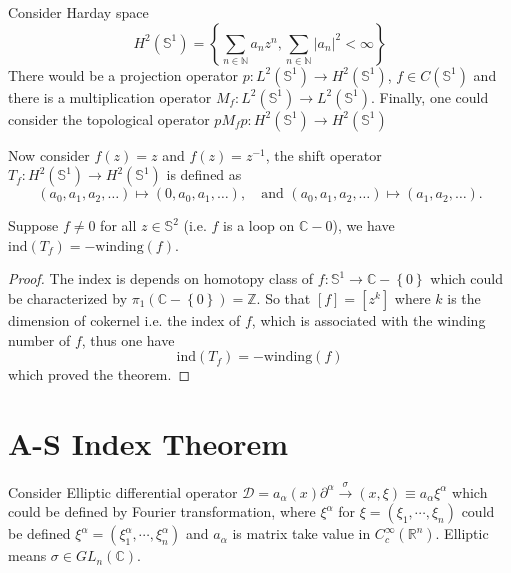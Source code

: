 \documentclass[10pt]{article}
\begin{document}
\begin{example}
  Consider Harday space
  \begin{equation*}
    H^{2}(\mathbb{S}^{1}) = \left\{ \sum_{n \in \mathbb{N}} a_{n} z^{n}, \sum_{n \in \mathbb{N}} \left| a_n \right|^{2} < \infty \right\}
  \end{equation*}
  There would be a projection operator $ p : L^{2}(\mathbb{S}^{1}) \rightarrow H^{2}(\mathbb{S}^{1})$, $ f \in C(\mathbb{S}^{1})$ and there is a multiplication operator $ M_{f} : L^{2}(\mathbb{S}^{1}) \rightarrow L^{2}(\mathbb{S}^{1})$.
  Finally, one could consider the topological operator $ p M_{f} p : H^{2}(\mathbb{S}^{1}) \rightarrow H^{2}(\mathbb{S}^{1})$

  Now consider $ f(z) = z$ and $ f(z) = z^{-1}$, the shift operator $ T_{f} : H^{2}(\mathbb{S}^{1}) \rightarrow H^{2}(\mathbb{S}^{1})$ is defined as
  \begin{equation*}
    (a_0, a_1, a_2, \ldots) \mapsto (0, a_0, a_1, \ldots), \quad \text{and } (a_0, a_1, a_2, \ldots) \mapsto (a_1, a_2, \ldots).
  \end{equation*}
  \begin{theorem}
    Suppose $ f \neq 0$ for all $ z \in \mathbb{S}^{2}$ (i.e. $ f$ is a loop on $ \mathbb{C}- {0}$), we have $ \mathrm{ind}(T_{f}) = - \mathrm{winding}(f)$.
  \end{theorem}
  \begin{proof}
    The index is depends on homotopy class of $ f: \mathbb{S}^{1} \rightarrow \mathbb{C}-\left\{ 0 \right\}$ which could be characterized by $ \pi_1(\mathbb{C}-\left\{ 0 \right\}) = \mathbb{Z}$. So that $[f] = [z^{k}]$ where $ k$ is the dimension of cokernel i.e. the index of $ f$, which is associated with the winding number of $ f$, thus one have
    \begin{equation*}
      \mathrm{ind}(T_{f}) = - \mathrm{winding}(f)
    \end{equation*}
    which proved the theorem.
  \end{proof}
\end{example}

\section{A-S Index Theorem}

Consider Elliptic differential operator $ \mathcal{D} = a_{\alpha}(x) \partial^{\alpha} \xrightarrow \sigma(x, \xi) \equiv a_{\alpha} \xi^{\alpha}$ which could be defined by Fourier transformation,
where $ \xi^{\alpha}$ for $ \xi = (\xi_{1},\cdots ,\xi_{n})$ could be defined  $ \xi^{\alpha} = (\xi_{1}^{\alpha}, \cdots ,\xi_{n}^{\alpha})$ and $ a_{\alpha}$ is matrix take value in $ C^{\infty }_{c}(\mathbb{R}^{n})$.
Elliptic means $ \sigma \in GL_{n}(\mathbb{C})$.
\end{document}
